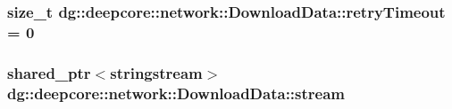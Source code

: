 \subsubsection[{\texorpdfstring{retry\+Timeout}{retryTimeout}}]{\setlength{\rightskip}{0pt plus 5cm}size\+\_\+t dg\+::deepcore\+::network\+::\+Download\+Data\+::retry\+Timeout = 0}\hypertarget{structdg_1_1deepcore_1_1network_1_1_download_data_add02feb92c22b90770806710e79aeb9d}{}\label{structdg_1_1deepcore_1_1network_1_1_download_data_add02feb92c22b90770806710e79aeb9d}
\subsubsection[{\texorpdfstring{stream}{stream}}]{\setlength{\rightskip}{0pt plus 5cm}shared\+\_\+ptr$<$stringstream$>$ dg\+::deepcore\+::network\+::\+Download\+Data\+::stream}\hypertarget{structdg_1_1deepcore_1_1network_1_1_download_data_acef37a81041f0566a49a0a2c7477445e}{}\label{structdg_1_1deepcore_1_1network_1_1_download_data_acef37a81041f0566a49a0a2c7477445e}

